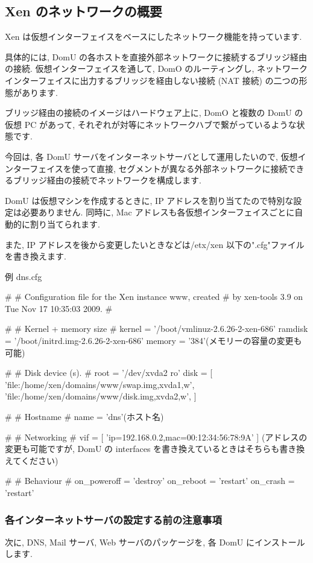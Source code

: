 \documentclass[mingoth,a4paper]{jsarticle}
\begin{document}
\subsection{Xen のネットワークの概要}
Xen は仮想インターフェイスをベースにしたネットワーク機能を持っています.

具体的には, DomU の各ホストを直接外部ネットワークに接続するブリッジ経由の接続. 仮想インターフェイスを通して, DomO のルーティングし, ネットワークインターフェイスに出力するブリッジを経由しない接続 (NAT 接続) の二つの形態があります.

ブリッジ経由の接続のイメージはハードウェア上に, DomO と複数の DomU の仮想 PC があって, それぞれが対等にネットワークハブで繋がっているような状態です.

今回は, 各 DomU サーバをインターネットサーバとして運用したいので, 仮想インターフェイスを使って直接, セグメントが異なる外部ネットワークに接続できるブリッジ経由の接続でネットワークを構成します.

DomU は仮想マシンを作成するときに, IP アドレスを割り当てたので特別な設定は必要ありません. 同時に, Mac アドレスも各仮想インターフェイスごとに自動的に割り当てられます.

また, IP アドレスを後から変更したいときなどは/etx/xen 以下の".cfg"ファイルを書き換えます.

例  dns.cfg
\begin{commandline}
#
# Configuration file for the Xen instance www, created
# by xen-tools 3.9 on Tue Nov 17 10:35:03 2009.
#

#
#  Kernel + memory size
#
kernel      = '/boot/vmlinuz-2.6.26-2-xen-686'
ramdisk     = '/boot/initrd.img-2.6.26-2-xen-686'
memory      = '384'(メモリーの容量の変更も可能)

#
#  Disk device (s).
#
root        = '/dev/xvda2 ro'
disk        = [
                  'file:/home/xen/domains/www/swap.img,xvda1,w',
                  'file:/home/xen/domains/www/disk.img,xvda2,w',
              ]


#
#  Hostname
#
name        = 'dns'(ホスト名)

#
#  Networking
#
vif         = [ 'ip=192.168.0.2,mac=00:12:34:56:78:9A' ]
(アドレスの変更も可能ですが, DomU の interfaces を書き換えているときはそちらも書き換えてください)

#
#  Behaviour
#
on_poweroff = 'destroy'
on_reboot   = 'restart'
on_crash    = 'restart'
\end{commandline}

\subsubsection{各インターネットサーバの設定する前の注意事項}
次に, DNS, Mail サーバ, Web サーバのパッケージを, 各 DomU にインストールします.
\end{document}
